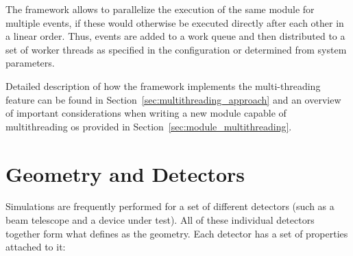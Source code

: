 The framework allows to parallelize the execution of the same module for multiple events, if these would otherwise be executed directly after each other in a linear order.
Thus, events are added to a work queue and then distributed to a set of worker threads as specified in the configuration or determined from system parameters.

Detailed description of how the framework implements the multi-threading feature can be found in Section~\ref{sec:multithreading_approach} and an overview of important considerations when writing a new module capable of multithreading os provided in Section~\ref{sec:module_multithreading}.

\section{Geometry and Detectors}
\label{sec:models_geometry}
Simulations are frequently performed for a set of different detectors (such as a beam telescope and a device under test).
All of these individual detectors together form what \apsq defines as the geometry.
Each detector has a set of properties attached to it:
